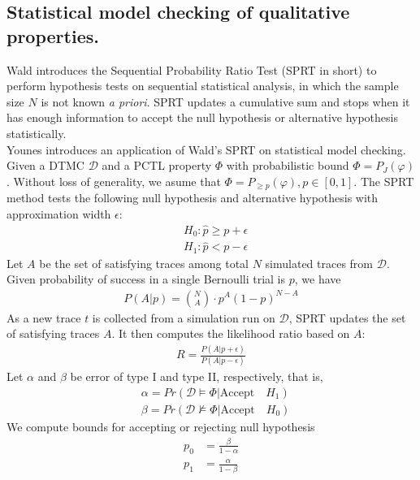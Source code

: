 \subsection{Statistical model checking of qualitative properties.}
Wald \cite{wald1945sequential} introduces the Sequential Probability Ratio Test (SPRT in short) to
perform hypothesis tests on sequential statistical analysis, in which the sample size $N$ is not
known \textit{a priori}. SPRT updates a cumulative sum and stops when it has enough information to
accept the null hypothesis or alternative hypothesis statistically.\\
Younes \cite{younes2002probabilistic} introduces an application of Wald's SPRT on statistical model
checking. Given a DTMC $\mathcal{D}$ and a PCTL property $\Phi$ with probabilistic bound $\Phi =
      P_J(\varphi)$. Without loss of generality, we asume that $\Phi = P_{\geq p}(\varphi),
      p\in[0,1]$. The SPRT method tests the following null hypothesis and alternative hypothesis with
approximation width $\epsilon$:
\begin{align*}
       & H_0: \hat{p} \geq p + \epsilon \\
       & H_1: \hat{p} < p - \epsilon
\end{align*}
Let $A$ be the set of satisfying traces among total $N$ simulated traces from $\mathcal{D}$. Given
probability of success in a single Bernoulli trial is $p$, we have
\begin{align*}
      P(A | p) = {N \choose A} \cdot p^A(1-p)^{N-A}
\end{align*}
As a new trace $t$ is collected from a simulation run on $\mathcal{D}$, SPRT updates the set of
satisfying traces $A$. It then computes the likelihood ratio based on $A$:
\begin{align*}
      R = \frac{P(A | p + \epsilon)}{P(A | p - \epsilon)}
\end{align*}
Let $\alpha$ and $\beta$ be error of type I and type II, respectively, that is,
\begin{align*}
       & \alpha = Pr(\mathcal{D} \models \Phi | \text{Accept}\quad H_1) \\
       & \beta =  Pr(\mathcal{D} \nvDash \Phi | \text{Accept}\quad H_0)
\end{align*}
We compute bounds for accepting or rejecting null hypothesis
\begin{align*}
      p_0 & = \frac{\beta}{1 - \alpha} \\
      p_1 & = \frac{\alpha}{1 - \beta}
\end{align*}

